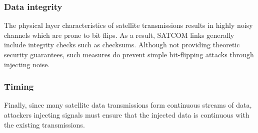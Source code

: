 \subsubsection{Data integrity}

The physical layer characteristics of satellite transmissions results in highly noisy channels which are prone to bit flips.
As a result, SATCOM links generally include integrity checks such as checksums.
Although not providing theoretic security guarantees, such measures do prevent simple bit-flipping attacks through injecting noise.

\subsubsection{Timing}

Finally, since many satellite data transmissions form continuous streams of data, attackers injecting signals must ensure that the injected data is continuous with the existing transmissions.

